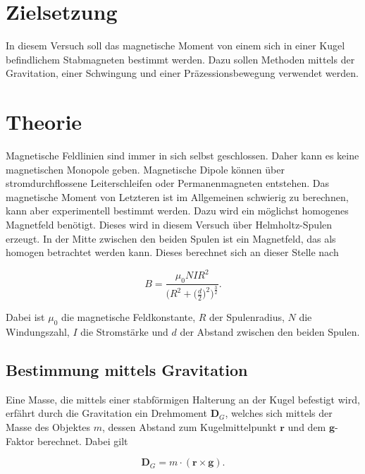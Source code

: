 \section{Zielsetzung}
In diesem Versuch soll das magnetische Moment von einem sich in einer Kugel befindlichem Stabmagneten bestimmt werden.
Dazu sollen Methoden mittels der Gravitation, einer Schwingung und einer Präzessionsbewegung verwendet werden.

\section{Theorie}
\label{sec:Theorie}

Magnetische Feldlinien sind immer in sich selbst geschlossen. Daher kann es keine magnetischen Monopole geben.
Magnetische Dipole können über stromdurchflossene Leiterschleifen oder Permanenmagneten entstehen. Das magnetische Moment von Letzteren ist im Allgemeinen schwierig zu berechnen, kann aber experimentell bestimmt werden.
Dazu wird ein möglichst homogenes Magnetfeld benötigt. Dieses wird in diesem Versuch über Helmholtz-Spulen erzeugt.
In der Mitte zwischen den beiden Spulen ist ein Magnetfeld, das als homogen betrachtet werden kann. 
Dieses berechnet sich an dieser Stelle nach

\begin{equation}
    \label{eqn:helmholtz}
    B = \frac{\mu_0 N I R^2}{\big(R^2 + \Big( \frac{d}{2} \Big)^2 \Big)^{\frac{3}{2}}}.
\end{equation}

Dabei ist $\mu_0$ die magnetische Feldkonstante, $R$ der Spulenradius, $N$ die Windungszahl, $I$ die Stromstärke und $d$ der Abstand zwischen den beiden Spulen.


\subsection{Bestimmung mittels Gravitation}

Eine Masse, die mittels einer stabförmigen Halterung an der Kugel befestigt wird, erfährt durch die Gravitation ein Drehmoment $\mathbf{D}_G$, welches sich mittels der Masse des Objektes $m$, dessen Abstand zum Kugelmittelpunkt $\mathbf{r}$ und dem $\mathbf{g}$-Faktor berechnet. Dabei gilt

\begin{equation}
    \label{eqn:dreh-grav}
    \mathbf{D}_G = m \cdot (\mathbf{r} \times \mathbf{g}).
\end{equation}

